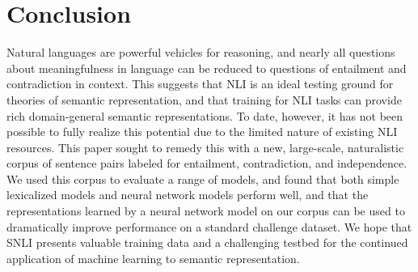 \section{Conclusion}\label{sec:conclusion}

Natural languages are powerful vehicles for reasoning, 
and nearly all questions about meaningfulness
in language can be reduced to questions of entailment
and contradiction in context. This suggests that NLI is an ideal testing ground
for theories of semantic representation, and that training for NLI
tasks can provide rich domain-general semantic representations.  To
date, however, it has not been possible to fully realize this
potential due to the limited nature of existing NLI resources.  This
paper sought to remedy this with a new, large-scale, naturalistic
corpus of sentence pairs labeled for entailment, contradiction, and
independence. We used this corpus to evaluate a range of models,
and found that both simple lexicalized models and neural network
models perform well, and that the representations learned by
a neural network model on our corpus can be used to dramatically 
improve performance on a standard challenge dataset. We hope that
SNLI presents valuable training data and a challenging testbed for the continued 
application of machine learning to semantic representation.